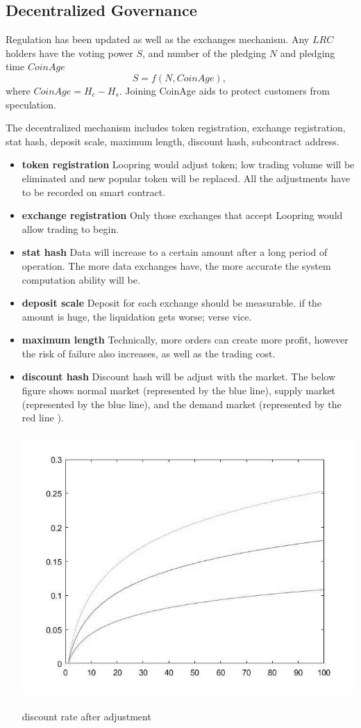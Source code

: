 \documentclass[UTF8,nofonts]{article}
\makeatletter
\newenvironment{figurehere}
 {\def\@captype{figure}}
 {}
\makeatother
\begin{document}
\subsection{Decentralized Governance}
Regulation has been updated as well as the exchanges mechanism. Any $LRC$ holders have the voting power $S$, and number of the pledging $N$ and pledging time $CoinAge$
$$S = f(N,  CoinAge)\text{, }$$
where $CoinAge = H_{c}-H_{s}$. Joining CoinAge aids to protect customers from speculation.

The decentralized mechanism includes token registration, exchange registration, stat hash, deposit scale, maximum length, discount hash, subcontract address.
 \begin{itemize}
   \item \textbf{token registration} Loopring would adjust token; low trading volume will be eliminated and new popular token will be replaced. All the adjustments have to be recorded on smart contract.
  \item \textbf{exchange registration} Only those exchanges that accept Loopring would allow trading to begin.
   \item \textbf{stat hash} Data will increase to a certain amount after a long period of operation. The more data exchanges have, the more accurate the system computation ability will be.
  \item \textbf{deposit scale} Deposit for each exchange should be measurable. if the amount is huge, the liquidation gets worse; verse vice.
   \item \textbf{maximum length} Technically, more orders can create more profit, however the risk of failure also increases, as well as the trading cost.
   \item \textbf{discount hash} Discount hash will be adjust with the market. The below figure shows  normal market (represented by the blue line), supply market (represented by the blue line), and the demand market (represented by the red line ).
\begin{center}
\begin{figurehere}
\includegraphics[height=10cm]{images/rate_adjust.jpg}
\caption{discount rate after adjustment}
\label{fig: dischargeRateAdjust}
\end{figurehere}
\end{center}


\end{itemize}
\end{document}
